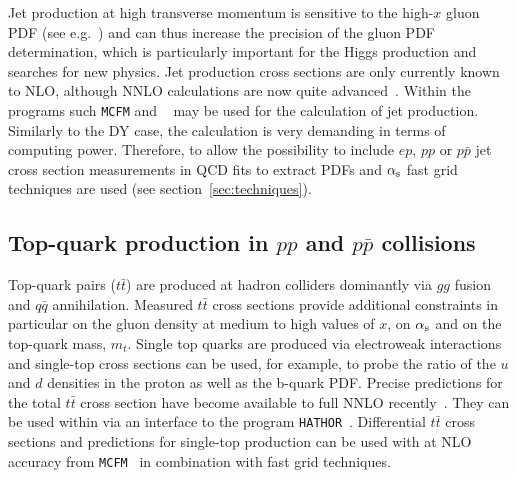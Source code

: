 Jet production at high transverse momentum is sensitive to the high-$x$ gluon 
PDF (see e.g.~\cite{MSTWpdf}) and can thus increase the precision of the 
gluon PDF determination, which is particularly important for the Higgs production and searches for new physics.
Jet production cross sections are only currently known to NLO, although NNLO 
calculations are now quite advanced~\cite{nigel:2013,nigel:2010,Currie:2013dwa}. 
Within \fitter the programs such \texttt{MCFM} and 
\nlojetpp~\cite{Nagy:1998bb,Nagy:2001fj} may be used for the 
calculation of jet production.
Similarly to the DY case, the calculation 
is very demanding in terms of computing power. 
Therefore, to allow the possibility to include  $ep$, $pp$ or $p\bar p$ 
jet cross section 
measurements in QCD fits to extract PDFs and $\alpha_\mathrm{s}$ fast 
grid techniques are used (see section~\ref{sec:techniques}).





\subsection{Top-quark production in $pp$ and $p \bar p$ collisions}

Top-quark pairs ($t \bar t$) are produced at hadron colliders dominantly via $gg$ fusion 
and $q \bar q$ annihilation. Measured $t \bar t$ cross sections provide additional 
constraints in particular on the gluon density at medium to high values of $x$, 
on $\alpha_\mathrm{s}$ and on the top-quark mass, $m_t$. 
Single top quarks are produced via electroweak interactions and single-top cross sections 
can be used, for example, to probe the ratio of the $u$ and $d$ densities in the proton 
as well as the b-quark PDF.
Precise predictions for the total $t \bar t$ cross section have become available 
to full NNLO recently~\cite{Czakon:2013goa}. They can be used within \fitter via an interface 
to the program \texttt{HATHOR}~\cite{Aliev:2010zk}. Differential $t \bar t$ cross sections and predictions 
for single-top production can be used with \fitter at NLO accuracy from 
\texttt{MCFM}~\cite{Campbell:2010ff,Campbell:2009ss,Campbell:2005bb,Campbell:2004ch,Campbell:2012uf} 
in combination with fast grid techniques.

